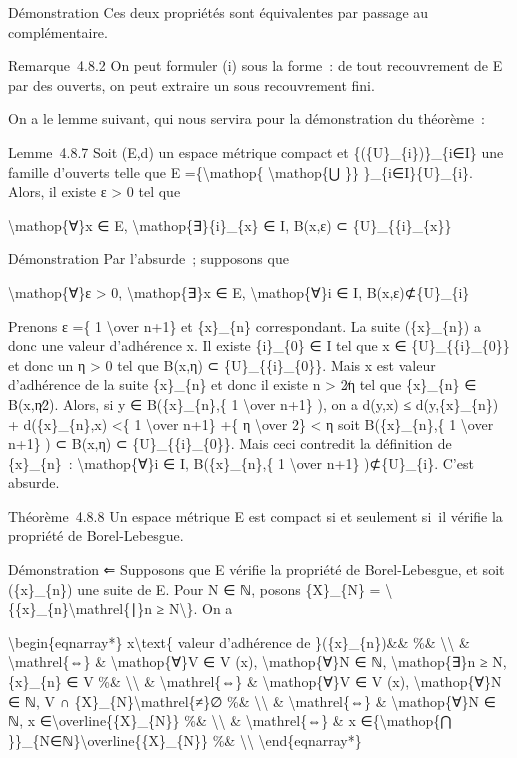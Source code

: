 \documentclass[]{article}
\begin{document}
Démonstration Ces deux propriétés sont équivalentes par passage au
complémentaire.

Remarque~4.8.2 On peut formuler (i) sous la forme~: de tout recouvrement
de E par des ouverts, on peut extraire un sous recouvrement fini.

On a le lemme suivant, qui nous servira pour la démonstration du
théorème~:

Lemme~4.8.7 Soit (E,d) un espace métrique compact et
\{(\{U\}\_\{i\})\}\_\{i∈I\} une famille d'ouverts telle que E
=\{\textbackslash{}mathop\{ \textbackslash{}mathop\{⋃ \}\}
\}\_\{i∈I\}\{U\}\_\{i\}. Alors, il existe ε \textgreater{} 0 tel que

\textbackslash{}mathop\{∀\}x ∈ E,
\textbackslash{}mathop\{∃\}\{i\}\_\{x\} ∈ I, B(x,ε) ⊂
\{U\}\_\{\{i\}\_\{x\}\}

Démonstration Par l'absurde~; supposons que

\textbackslash{}mathop\{∀\}ε \textgreater{} 0,
\textbackslash{}mathop\{∃\}x ∈ E, \textbackslash{}mathop\{∀\}i ∈ I,
B(x,ε)⊄\{U\}\_\{i\}

Prenons ε =\{ 1 \textbackslash{}over n+1\} et \{x\}\_\{n\}
correspondant. La suite (\{x\}\_\{n\}) a donc une valeur d'adhérence x.
Il existe \{i\}\_\{0\} ∈ I tel que x ∈ \{U\}\_\{\{i\}\_\{0\}\} et donc
un η \textgreater{} 0 tel que B(x,η) ⊂ \{U\}\_\{\{i\}\_\{0\}\}. Mais x
est valeur d'adhérence de la suite \{x\}\_\{n\} et donc il existe n
\textgreater{} 2∕η tel que \{x\}\_\{n\} ∈ B(x,η∕2). Alors, si y ∈
B(\{x\}\_\{n\},\{ 1 \textbackslash{}over n+1\} ), on a d(y,x) ≤
d(y,\{x\}\_\{n\}) + d(\{x\}\_\{n\},x) \textless{}\{ 1
\textbackslash{}over n+1\} +\{ η \textbackslash{}over 2\} \textless{} η
soit B(\{x\}\_\{n\},\{ 1 \textbackslash{}over n+1\} ) ⊂ B(x,η) ⊂
\{U\}\_\{\{i\}\_\{0\}\}. Mais ceci contredit la définition de
\{x\}\_\{n\}~: \textbackslash{}mathop\{∀\}i ∈ I, B(\{x\}\_\{n\},\{ 1
\textbackslash{}over n+1\} )⊄\{U\}\_\{i\}. C'est absurde.

Théorème~4.8.8 Un espace métrique E est compact si et seulement si~il
vérifie la propriété de Borel-Lebesgue.

Démonstration ⇐ Supposons que E vérifie la propriété de Borel-Lebesgue,
et soit (\{x\}\_\{n\}) une suite de E. Pour N ∈ ℕ, posons \{X\}\_\{N\} =
\textbackslash{}\{\{x\}\_\{n\}\textbackslash{}mathrel\{∣\}n ≥
N\textbackslash{}\}. On a

\textbackslash{}begin\{eqnarray*\} x\textbackslash{}text\{ valeur
d'adhérence de \}(\{x\}\_\{n\})\&\& \%\&
\textbackslash{}\textbackslash{} \& \textbackslash{}mathrel\{⇔\} \&
\textbackslash{}mathop\{∀\}V ∈ V (x), \textbackslash{}mathop\{∀\}N ∈ ℕ,
\textbackslash{}mathop\{∃\}n ≥ N, \{x\}\_\{n\} ∈ V \%\&
\textbackslash{}\textbackslash{} \& \textbackslash{}mathrel\{⇔\} \&
\textbackslash{}mathop\{∀\}V ∈ V (x), \textbackslash{}mathop\{∀\}N ∈ ℕ,
V ∩ \{X\}\_\{N\}\textbackslash{}mathrel\{≠\}∅ \%\&
\textbackslash{}\textbackslash{} \& \textbackslash{}mathrel\{⇔\} \&
\textbackslash{}mathop\{∀\}N ∈ ℕ, x
∈\textbackslash{}overline\{\{X\}\_\{N\}\} \%\&
\textbackslash{}\textbackslash{} \& \textbackslash{}mathrel\{⇔\} \& x
∈\{\textbackslash{}mathop\{⋂
\}\}\_\{N∈ℕ\}\textbackslash{}overline\{\{X\}\_\{N\}\} \%\&
\textbackslash{}\textbackslash{} \textbackslash{}end\{eqnarray*\}
\end{document}
